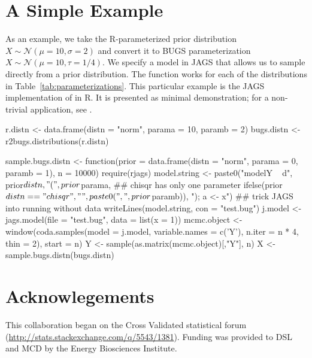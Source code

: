 \section{A Simple Example}

As an example, we take the R-parameterized prior distribution $X \sim \mathcal{N}(\mu=10,\sigma=2)$ and 
convert it to BUGS  parameterization $X \sim \mathcal{N}(\mu=10,\tau=1/4)$.
We specify a model in JAGS that allows us to sample directly from a prior distribution.  
The function works for each of the distributions in Table~\ref{tab:parameterizations}. 
This particular example is the JAGS implementation of  in R. 
It is presented as minimal demonstration;
for a non-trivial application, see \cite{lebauer2012ffb}. 

\begin{example}

r.distn <- data.frame(distn = "norm", parama = 10, paramb = 2)
bugs.distn <- r2bugs.distributions(r.distn)
   
sample.bugs.distn <- function(prior = data.frame(distn = "norm", parama = 0, paramb = 1), n = 10000) {
  require(rjags)
  model.string <- paste0("model{Y ~ d", prior$distn, 
                         "(", prior$parama, 
                         ## chisqr has only one parameter
                         ifelse(prior$distn == "chisqr", "", paste0(", ", prior$paramb)), 
                         "); a <- x}")  ## trick JAGS into running without data  
  writeLines(model.string, con = "test.bug")
  j.model  <- jags.model(file = "test.bug", data = list(x = 1))
  mcmc.object <- window(coda.samples(model = j.model, 
       variable.names = c('Y'), n.iter = n * 4, thin = 2),
                        start = n)
  Y <- sample(as.matrix(mcmc.object)[,"Y"], n)
}
X <- sample.bugs.distn(bugs.distn)
\end{example}

\section{Acknowlegements}

This collaboration began on the Cross Validated statistical forum (\url{http://stats.stackexchange.com/q/5543/1381}). Funding was provided to DSL and MCD by the Energy Biosciences Institute.




\address{David S.\ LeBauer\\
Energy Biosciences Institute\\
University of Illinois
USA}\\

\address{Michael C.\ Dietze\\
Department of Earth And Environment\\
Boston University\\
USA}

\address{Benjamin M.\ Bolker\\
Department of Mathematics \& Statistics\\
McMaster University\\
Canada}
